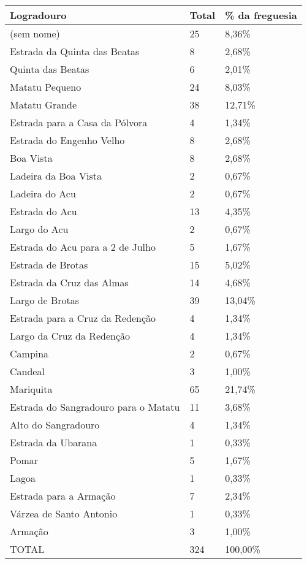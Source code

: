 \begin{table}[!htp]
\centering
{}
{ \begin{tabular}{lll}
\toprule
Logradouro				& Total	& \% da freguesia\\
\midrule \midrule
(sem nome)				& 25				& 8,36\%		\\
Estrada da Quinta das Beatas		& 8				& 2,68\%		\\
Quinta das Beatas			& 6				& 2,01\%		\\
Matatu Pequeno				& 24				& 8,03\%		\\
Matatu Grande				& 38				& 12,71\%	\\
Estrada para a Casa da Pólvora		& 4				& 1,34\%		\\
Estrada do Engenho Velho		& 8				& 2,68\%		\\
Boa Vista				& 8				& 2,68\%		\\
Ladeira da Boa Vista			& 2				& 0,67\%		\\
Ladeira do Acu				& 2				& 0,67\%		\\
Estrada do Acu				& 13				& 4,35\%		\\
Largo do Acu				& 2				& 0,67\%		\\
Estrada do Acu para a 2 de Julho	& 5				& 1,67\%		\\
Estrada de Brotas			& 15				& 5,02\%		\\
Estrada da Cruz das Almas		& 14				& 4,68\%		\\
Largo de Brotas				& 39				& 13,04\%	\\
Estrada para a Cruz da Redenção		& 4				& 1,34\%		\\
Largo da Cruz da Redenção		& 4				& 1,34\%		\\
Campina					& 2				& 0,67\%		\\
Candeal					& 3				& 1,00\%		\\
Mariquita				& 65				& 21,74\%	\\
Estrada do Sangradouro para o Matatu	& 11				& 3,68\%		\\
Alto do Sangradouro			& 4				& 1,34\%		\\
Estrada da Ubarana			& 1				& 0,33\%		\\
Pomar					& 5				& 1,67\%		\\
Lagoa					& 1				& 0,33\%		\\
Estrada para a Armação			& 7				& 2,34\%		\\
Várzea de Santo Antonio			& 1				& 0,33\%		\\
Armação					& 3				& 1,00\%		\\
\midrule
TOTAL					& 324				& 100,00\%	\\
\bottomrule
\end{tabular}}
{}
\end{table}